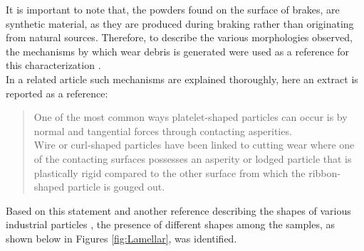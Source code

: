 It is important to note that, the powders found on the surface of brakes, are synthetic material, as they are produced during braking rather than originating from natural sources. Therefore, to describe the various morphologies observed, the mechanisms by which wear debris is generated were used as a reference for this characterization .\\
In a related article such mechanisms are explained thoroughly, here an extract is reported as a reference:
\pagebreak
\blockquote[\cite{machinerylubricationAnatomyWear}]{
One of the most common ways platelet-shaped particles can occur is by normal and tangential forces through contacting asperities. \\

Wire or curl-shaped particles have been linked to cutting wear where one of the contacting surfaces possesses an asperity or lodged particle that is plastically rigid compared to the other surface from which the ribbon-shaped particle is gouged out.}

Based on this statement and another reference describing the shapes of various industrial particles \cite{ulusoy2023review}, the presence of different shapes among the samples, as shown below in Figures \ref{fig:Lamellar}, was identified.

